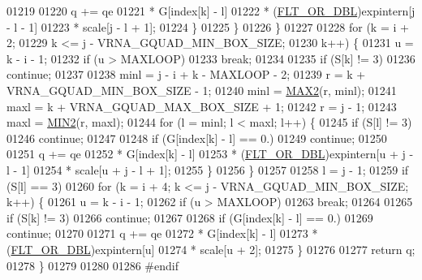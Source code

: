 \begin{DoxyCode}
01219 
01220         q += qe
01221              * G[index[k] - l]
01222              * (\hyperlink{group__data__structures_ga31125aeace516926bf7f251f759b6126}{FLT\_OR\_DBL})expintern[j - l - 1]
01223              * scale[j - l + 1];
01224       \}
01225     \}
01226   \}
01227 
01228   \textcolor{keywordflow}{for} (k = i + 2;
01229        k <= j - VRNA\_GQUAD\_MIN\_BOX\_SIZE;
01230        k++) \{
01231     u = k - i - 1;
01232     \textcolor{keywordflow}{if} (u > MAXLOOP)
01233       \textcolor{keywordflow}{break};
01234 
01235     \textcolor{keywordflow}{if} (S[k] != 3)
01236       \textcolor{keywordflow}{continue};
01237 
01238     minl  = j - i + k - MAXLOOP - 2;
01239     r     = k + VRNA\_GQUAD\_MIN\_BOX\_SIZE - 1;
01240     minl  = \hyperlink{group__utils_ga33297b3679c713b0c4d897cd0fe3b122}{MAX2}(r, minl);
01241     maxl  = k + VRNA\_GQUAD\_MAX\_BOX\_SIZE + 1;
01242     r     = j - 1;
01243     maxl  = \hyperlink{group__utils_gae0b9cd0ce090bd69b951aa73e8fa4f7d}{MIN2}(r, maxl);
01244     \textcolor{keywordflow}{for} (l = minl; l < maxl; l++) \{
01245       \textcolor{keywordflow}{if} (S[l] != 3)
01246         \textcolor{keywordflow}{continue};
01247 
01248       \textcolor{keywordflow}{if} (G[index[k] - l] == 0.)
01249         \textcolor{keywordflow}{continue};
01250 
01251       q += qe
01252            * G[index[k] - l]
01253            * (\hyperlink{group__data__structures_ga31125aeace516926bf7f251f759b6126}{FLT\_OR\_DBL})expintern[u + j - l - 1]
01254            * scale[u + j - l + 1];
01255     \}
01256   \}
01257 
01258   l = j - 1;
01259   \textcolor{keywordflow}{if} (S[l] == 3)
01260     \textcolor{keywordflow}{for} (k = i + 4; k <= j - VRNA\_GQUAD\_MIN\_BOX\_SIZE; k++) \{
01261       u = k - i - 1;
01262       \textcolor{keywordflow}{if} (u > MAXLOOP)
01263         \textcolor{keywordflow}{break};
01264 
01265       \textcolor{keywordflow}{if} (S[k] != 3)
01266         \textcolor{keywordflow}{continue};
01267 
01268       \textcolor{keywordflow}{if} (G[index[k] - l] == 0.)
01269         \textcolor{keywordflow}{continue};
01270 
01271       q += qe
01272            * G[index[k] - l]
01273            * (\hyperlink{group__data__structures_ga31125aeace516926bf7f251f759b6126}{FLT\_OR\_DBL})expintern[u]
01274            * scale[u + 2];
01275     \}
01276 
01277   \textcolor{keywordflow}{return} q;
01278 \}
01279 
01280 
01286 \textcolor{preprocessor}{#endif}
\end{DoxyCode}
